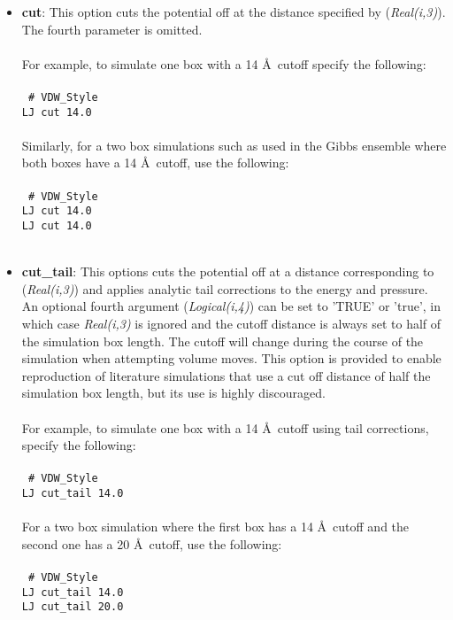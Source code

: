 \begin{itemize}
\item \textbf{cut}: This option cuts the  potential  off at the  distance
specified by (\emph{Real(i,3)}). The fourth parameter is omitted. \\ \\
%
For example, to simulate one box with a 14 \AA\ cutoff specify the following:
\\ \\
\texttt{
\# VDW\_Style \\
LJ cut 14.0 } \\ \\
%
Similarly, for a two box simulations such as used in the Gibbs
ensemble where both boxes have a 14 \AA\ cutoff, use the
following: \\ \\
\texttt{
\# VDW\_Style \\
LJ cut 14.0 \\
LJ cut 14.0 } \\ \\
%
\item \textbf{cut\_tail}: This options cuts the potential off at a distance
corresponding to (\emph{Real(i,3)}) and applies analytic tail
corrections to the energy and pressure. An optional fourth argument
(\emph{Logical(i,4)}) can be set 
to 'TRUE' or 'true', in which case \emph{Real(i,3)} is ignored and the cutoff
distance is always set to half of the simulation box length. The
cutoff will change during the course of the simulation when attempting
volume moves.  This option is provided to enable reproduction of
literature simulations that use a cut off distance of half the
simulation box length, but its use is highly discouraged. \\ \\ 
%
For example, to simulate one box with a 14 \AA\ cutoff using tail
corrections, specify the following:
\\ \\
\texttt{
\# VDW\_Style \\
LJ cut\_tail 14.0 } \\ \\
%
For a two box simulation where the first box has a 14 \AA\ cutoff and
the second one has a 20 \AA\ cutoff, use the
following:
\\ \\
\texttt{
\# VDW\_Style \\
LJ cut\_tail 14.0 \\ 
LJ cut\_tail 20.0 } \\ \\

\end{itemize}
